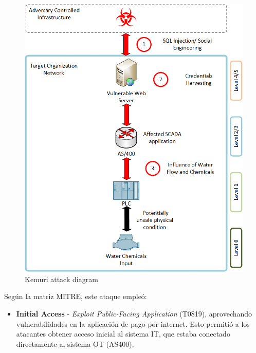 \begin{paracol}{2}

    \colfill
    \begin{figure}[htbp]
        \centering
        \includegraphics[width=1\columnwidth]{images/kemuri.png}
        \caption{Kemuri attack diagram}
        \label{fig:kemuri}
    \end{figure}
    \colfill

    \switchcolumn
    \colfill



Según la matriz MITRE, este ataque empleó:

\begin{itemize}
    \item \textbf{Initial Access} - \textit{Exploit Public-Facing Application} (T0819), aprovechando vulnerabilidades en la aplicación de pago por internet.
    Esto permitió a los atacantes obtener acceso inicial al sistema \textsc{IT}, que estaba conectado directamente al sistema \textsc{OT} (AS400).
    
    

\end{itemize}
\end{paracol}
